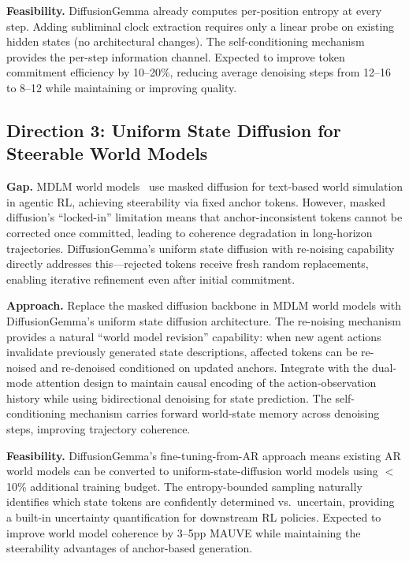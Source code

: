 \documentclass[11pt,a4paper]{article}
\begin{document}
\textbf{Feasibility.} DiffusionGemma already computes per-position entropy at every step. Adding subliminal clock extraction requires only a linear probe on existing hidden states (no architectural changes). The self-conditioning mechanism provides the per-step information channel. Expected to improve token commitment efficiency by 10--20\%, reducing average denoising steps from 12--16 to 8--12 while maintaining or improving quality.

\subsection{Direction 3: Uniform State Diffusion for Steerable World Models}

\textbf{Gap.} MDLM world models~\cite{mdlmwm2026} use masked diffusion for text-based world simulation in agentic RL, achieving steerability via fixed anchor tokens. However, masked diffusion's ``locked-in'' limitation means that anchor-inconsistent tokens cannot be corrected once committed, leading to coherence degradation in long-horizon trajectories. DiffusionGemma's uniform state diffusion with re-noising capability directly addresses this---rejected tokens receive fresh random replacements, enabling iterative refinement even after initial commitment.

\textbf{Approach.} Replace the masked diffusion backbone in MDLM world models with DiffusionGemma's uniform state diffusion architecture. The re-noising mechanism provides a natural ``world model revision'' capability: when new agent actions invalidate previously generated state descriptions, affected tokens can be re-noised and re-denoised conditioned on updated anchors. Integrate with the dual-mode attention design to maintain causal encoding of the action-observation history while using bidirectional denoising for state prediction. The self-conditioning mechanism carries forward world-state memory across denoising steps, improving trajectory coherence.

\textbf{Feasibility.} DiffusionGemma's fine-tuning-from-AR approach means existing AR world models can be converted to uniform-state-diffusion world models using $<$10\% additional training budget. The entropy-bounded sampling naturally identifies which state tokens are confidently determined vs.\ uncertain, providing a built-in uncertainty quantification for downstream RL policies. Expected to improve world model coherence by 3--5pp MAUVE while maintaining the steerability advantages of anchor-based generation.
\end{document}

